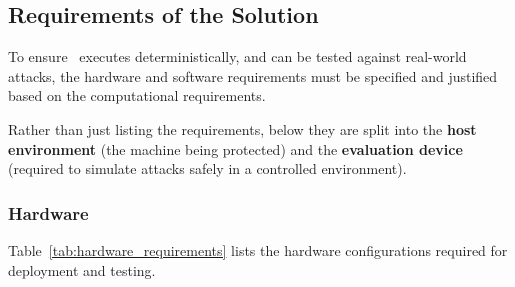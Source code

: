 \subsection{Requirements of the Solution}

To ensure \projectNameFormatted\ executes deterministically, and can be tested against real-world attacks, the hardware and software requirements must be specified and justified based on the computational requirements.

Rather than just listing the requirements, below they are split into the \textbf{host environment} (the machine being protected) and the \textbf{evaluation device} (required to simulate attacks safely in a controlled environment).

\subsubsection{Hardware}

Table~\ref{tab:hardware_requirements} lists the hardware configurations required for deployment and testing.


